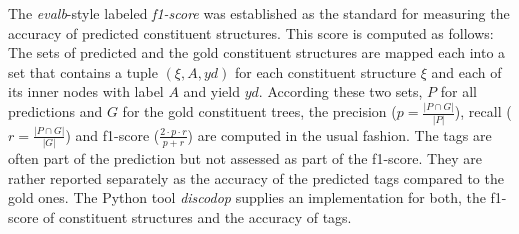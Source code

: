 \documentclass[../document.tex]{subfiles}
\begin{document}
    The \emph{evalb}-style labeled \emph{f1-score} \citep{Black91,Col97} was established as the standard for measuring the accuracy of predicted constituent structures.
    This score is computed as follows:
    The sets of predicted and the gold constituent structures are mapped each into a set that contains a tuple \((\xi, A, \mathit{yd})\) for each constituent structure \(\xi\) and each of its inner nodes with label \(A\) and yield \(\mathit{yd}\).
    According these two sets, \(P\) for all predictions and \(G\) for the gold constituent trees, the precision (\(p = \frac{|P \cap G|}{|P|}\)), recall (\(r = \frac{|P \cap G|}{|G|}\)) and f1-score (\(\frac{2\cdot p\cdot r}{p + r}\)) are computed in the usual fashion.
    The  tags are often part of the prediction but not assessed as part of the f1-score.
    They are rather reported separately as the accuracy of the predicted  tags compared to the gold ones.
    The Python tool \emph{discodop} supplies an implementation for both, the f1-score of constituent structures and the accuracy of  tags. \citep{CraSchBod16}
\end{document}
